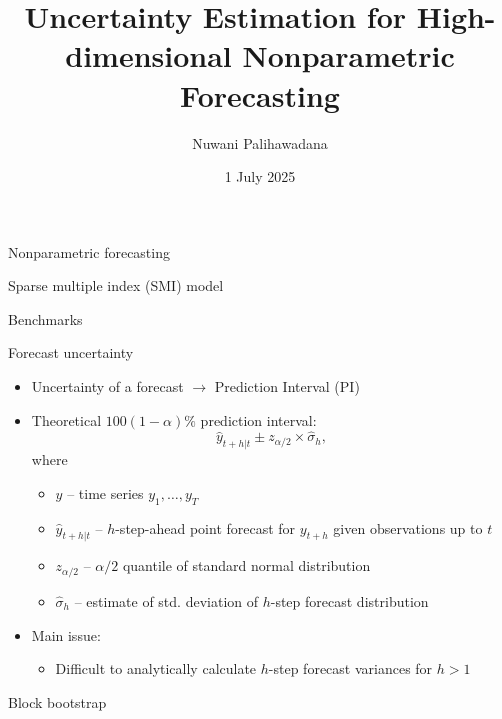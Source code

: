 \documentclass[
  12pt,
  ignorenonframetext,
  aspectratio=169,
]{beamer}
\title{Uncertainty Estimation for High-dimensional Nonparametric
Forecasting}
\author{Nuwani Palihawadana}
\date{1 July 2025}
\begin{document}
\frame{\titlepage}


\begin{frame}{Nonparametric forecasting}
\label{nonparametric-forecasting}
\end{frame}

\begin{frame}{Sparse multiple index (SMI) model}
\label{sparse-multiple-index-smi-model}
\end{frame}

\begin{frame}{Benchmarks}
\label{benchmarks}
\end{frame}

\begin{frame}{Forecast uncertainty}
\label{forecast-uncertainty}
\begin{itemize}
  \item Uncertainty of a forecast \alert{${\rightarrow}$ Prediction Interval (PI)}
  \pause
  \item Theoretical $100(1 - \alpha)\%$ prediction interval:
$$
  \hat{y}_{t+h|t} \pm z_{\alpha/2} \times \hat{\sigma}_{h},
$$
where
  \begin{itemize}
    \item \small \color{black} $y$ -- \color{violet} time series $y_{1}, \dots, y_{T}$
    \item \small \color{black} $\hat{y}_{t+h|t}$ -- \color{violet} $h$-step-ahead point forecast for $y_{t+h}$ given observations up to $t$
    \item \small \color{black} $z_{\alpha/2}$ -- \color{violet} $\alpha/2$ quantile of standard normal distribution
    \item \small \color{black} $\hat{\sigma}_{h}$ -- \color{violet} estimate of std. deviation of $h$-step forecast distribution
  \end{itemize}
  \pause
  \item Main issue:
  \begin{itemize}
    \item \small \color{blue} Difficult to analytically calculate $h$-step forecast variances for $h > 1$
  \end{itemize}
\end{itemize}
\end{frame}

\begin{frame}{Block bootstrap}
\label{block-bootstrap}
\end{frame}
\end{document}
